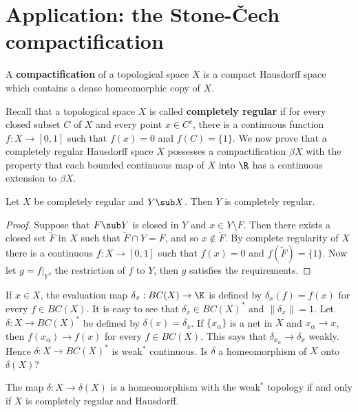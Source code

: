\section{Application: the Stone-\v{C}ech compactification}
\begin{definition}
A \textbf{compactification} of a topological space $X$ is a compact Hausdorff space which contains a dense homeomorphic copy of $X$.
\end{definition}
Recall that a topological space $X$ is called \textbf{completely regular} if for every closed subset $C$ of $X$ and every point $x\in C^c$, there is a continuous function $f:X\to [0,1]$ such that $f(x)=0$ and $f(C)=\{1\}$. We now prove that a completely regular Hausdorff space $X$ possesses a compactification $\beta X$ with the property that each bounded continuous map of $X$ into $\R$ has a continuous extension to $\beta X$.\par
\begin{lemma}
Let $X$ be completely regular and $Y\sub X$. Then $Y$ is completely regular.
\end{lemma}
\begin{proof}
Suppose that $F\sub Y$ is closed in $Y$ and $x\in Y\setminus F$. Then there exists a closed set $\widetilde{F}$ in $X$ such that $\widetilde{F}\cap Y=F$, and so $x\notin\widetilde{F}$. By complete regularity of $X$ there is a continuous $f:X\to [0,1]$ such that $f(x)=0$ and $f(\widetilde{F})=\{1\}$. Now let $g=f|_{Y}$, the restriction of $f$ to $Y$, then $g$ satisfies the requirements.
\end{proof}
If $x\in X$, the evaluation map $\delta_x:BC(X)\to\K$ is defined by $\delta_x(f)=f(x)$ for every $f\in BC(X)$. It is easy to see that $\delta_x\in BC(X)^*$ and $\|\delta_x\|=1$. Let $\delta:X\to BC(X)^*$ be defined by $\delta(x)=\delta_x$. If $\{x_\alpha\}$ is a net in $X$ and $x_\alpha\to x$, then $f(x_\alpha)\to f(x)$ for every $f\in BC(X)$. This says that $\delta_{x_\alpha}\to\delta_x$ weakly. Hence $\delta:X\to BC(X)^*$ is weak$^*$ continuous. Is $\delta$ a homeomorphism of $X$ onto $\delta(X)$?
\begin{proposition}\label{evaluation on BC(X) is homeomorphism iff completely regular}
The map $\delta:X\to\delta(X)$ is a homeomorphism with the weak$^*$ topology if and only if $X$ is completely regular and Hausdorff.
\end{proposition}
